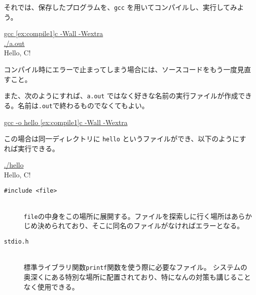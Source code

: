 それでは、保存したプログラムを、\texttt{gcc} を用いてコンパイルし、実行してみよう。
\begin{commandline2}
    \prompt \underline{gcc \ref{ex:compile1}c -Wall -Wextra} \\
    \prompt \underline{./a.out} \\
    Hello, C!
\end{commandline2} \noindent
コンパイル時にエラーで止まってしまう場合には、ソースコードをもう一度見直すこと。

また、次のようにすれば、\texttt{a.out} ではなく好きな名前の実行ファイルが作成できる。名前は\texttt{.out}で終わるものでなくてもよい。
\begin{commandline2}
    \prompt \underline{gcc -o hello \ref{ex:compile1}c -Wall -Wextra}
\end{commandline2} \noindent
この場合は同一ディレクトリに \texttt{hello} というファイルができ、以下のようにすれば実行できる。
\begin{commandline2}
    \prompt \underline{./hello} \\
    Hello, C!
\end{commandline2}

\begin{description}
    \item[\texttt{\#include <file>}]\mbox{}\\ \texttt{file}の中身をこの場所に展開する。ファイルを探索しに行く場所はあらかじめ決められており、そこに同名のファイルがなければエラーとなる。
    \item[\texttt{stdio.h}]\mbox{}\\ 標準ライブラリ関数\texttt{printf}関数を使う際に必要なファイル。
          システムの奥深くにある特別な場所に配置されており、特になんの対策も講じることなく使用できる。
\end{description}


